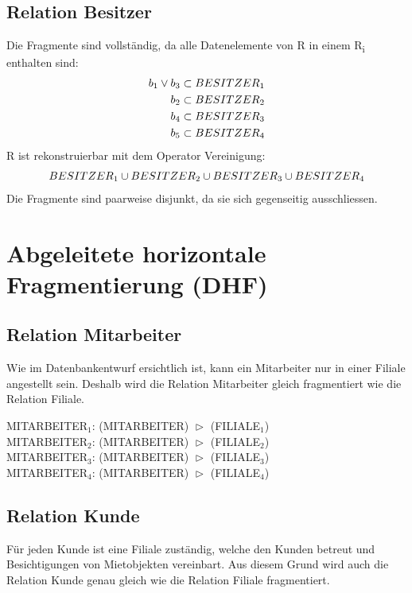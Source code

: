 \documentclass[11pt,a4paper,parskip=half]{scrartcl}
\begin{document}
\subsection{Relation Besitzer}
Die Fragmente sind vollständig, da alle Datenelemente von R in einem R\textsubscript{i} enthalten sind:\\
\begin{align*}
b\textsubscript{1} \vee b\textsubscript{3} \subset  BESITZER\textsubscript{1}\\
b\textsubscript{2} \subset  BESITZER\textsubscript{2}\\
b\textsubscript{4} \subset  BESITZER\textsubscript{3}\\
b\textsubscript{5} \subset  BESITZER\textsubscript{4}\\
\end{align*}
R ist rekonstruierbar mit dem Operator Vereinigung:\\
\begin{align*}
BESITZER\textsubscript{1} \cup BESITZER\textsubscript{2} \cup BESITZER\textsubscript{3} \cup BESITZER\textsubscript{4}\\
\end{align*}
Die Fragmente sind paarweise disjunkt, da sie sich gegenseitig ausschliessen.

\section{Abgeleitete horizontale Fragmentierung (DHF)}
\subsection{Relation Mitarbeiter}
Wie im Datenbankentwurf ersichtlich ist, kann ein Mitarbeiter nur in einer Filiale angestellt sein. Deshalb wird die Relation Mitarbeiter gleich fragmentiert wie die Relation Filiale. 

MITARBEITER$_1$: (MITARBEITER) $\vartriangleright$ (FILIALE$_1$)\\
MITARBEITER$_2$: (MITARBEITER) $\vartriangleright$ (FILIALE$_2$)\\
MITARBEITER$_3$: (MITARBEITER) $\vartriangleright$ (FILIALE$_3$)\\
MITARBEITER$_4$: (MITARBEITER) $\vartriangleright$ (FILIALE$_4$)

\subsection{Relation Kunde}
Für jeden Kunde ist eine Filiale zuständig, welche den Kunden betreut und Besichtigungen von Mietobjekten vereinbart. Aus diesem Grund wird auch die Relation Kunde genau gleich wie die Relation Filiale fragmentiert. 
\end{document}
